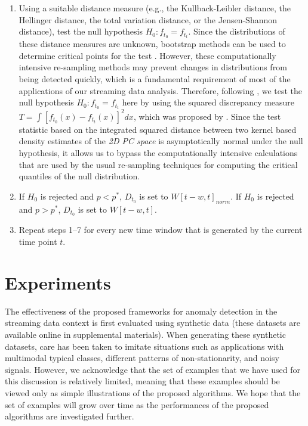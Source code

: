 \documentclass[12pt]{article}
\begin{document}
\begin{enumerate}
\def\labelenumi{\arabic{enumi}.}
\setcounter{enumi}{5}
\item
  Using a suitable distance measure (e.g., the Kullback-Leibler
  distance, the Hellinger distance, the total variation distance, or the
  Jensen-Shannon distance), test the null hypothesis
  \(H_{0}: f_{t_{0}} = f_{t_{t}}\). Since the distributions of these
  distance measures are unknown, bootstrap methods can be used to
  determine critical points for the test \citep{anderson1994two}.
  However, these computationally intensive re-sampling methods may
  prevent changes in distributions from being detected quickly, which is
  a fundamental requirement of most of the applications of our streaming
  data analysis. Therefore, following \citet{duong2012closed}, we test
  the null hypothesis \(H_{0}: f_{t_{0}} = f_{t_{t}}\) here by using the
  squared discrepancy measure
  \(T = \int [f_{t_{0}}(x) - f_{t_{t}}(x)]^2dx\), which was proposed by
  \citet{anderson1994two}. Since the test statistic based on the
  integrated squared distance between two kernel based density estimates
  of the \emph{2D PC space} is asymptotically normal under the null
  hypothesis, it allows us to bypass the computationally intensive
  calculations that are used by the usual re-sampling techniques for
  computing the critical quantiles of the null distribution.
\item
  If \(H_{0}\) is rejected and \(p < p^{*}\), \(D_{t_{0}}\) is set to
  \(W[t-w, t]_{norm}\). If \(H_{0}\) is rejected and \(p > p^{*}\),
  \(D_{t_{0}}\) is set to \(W[t-w, t]\).
\item
  Repeat steps 1--7 for every new time window that is generated by the
  current time point \(t\).
\end{enumerate}

\hypertarget{experiments}{%
\section{Experiments}\label{experiments}}

\label{sec:experiment}

The effectiveness of the proposed frameworks for anomaly detection in
the streaming data context is first evaluated using synthetic data
(these datasets are available online in supplemental materials). When
generating these synthetic datasets, care has been taken to imitate
situations such as applications with multimodal typical classes,
different patterns of non-stationarity, and noisy signals. However, we
acknowledge that the set of examples that we have used for this
discussion is relatively limited, meaning that these examples should be
viewed only as simple illustrations of the proposed algorithms. We hope
that the set of examples will grow over time as the performances of the
proposed algorithms are investigated further.
\end{document}
